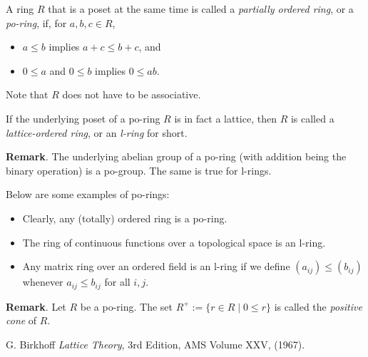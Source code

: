 \documentclass[12pt]{article}
\begin{document}
A ring $R$ that is a poset at the same time is called a \emph{partially ordered ring}, or a \emph{po-ring}, if, for $a,b,c\in R$,
\begin{itemize}
\item $a\le b$ implies $a+c\le b+c$, and
\item $0\le a$ and $0\le b$ implies $0\le ab$.
\end{itemize}

Note that $R$ does not have to be associative.

If the underlying poset of a po-ring $R$ is in fact a lattice, then $R$ is called a \emph{lattice-ordered ring}, or an \emph{l-ring} for short.

\textbf{Remark}.  The underlying abelian group of a po-ring (with addition being the binary operation) is a po-group.  The same is true for l-rings.

Below are some examples of po-rings:
\begin{itemize}
\item Clearly, any (totally) ordered ring is a po-ring.
\item The ring of continuous functions over a topological space is an l-ring.
\item Any matrix ring over an ordered field is an l-ring if we define $(a_{ij})\le (b_{ij})$ whenever $a_{ij}\le b_{ij}$ for all $i,j$.
\end{itemize}

\textbf{Remark}.  Let $R$ be a po-ring.  The set $R^+:=\lbrace r\in R\mid 0\le r\rbrace$ is called the \emph{positive cone} of $R$.

\begin{thebibliography}{8}
 G. Birkhoff {\em Lattice Theory}, 3rd Edition, AMS Volume XXV, (1967).
\end{thebibliography}
\end{document}
